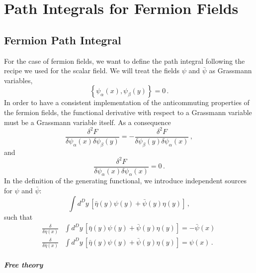 \documentclass[notes]{subfiles}
\renewcommand{\psibar}{\bar{\psi}}
\renewcommand{\etabar}{\bar{\eta}}
\begin{document}
\chapter{Path Integrals for Fermion Fields}
\label{cha:path-integr-ferm}
\section{Fermion Path Integral}
\label{sec:ferm-path-integr}

For the case of fermion fields, we want to define the path integral
following the recipe we used for the scalar field. We will treat the
fields $\psi$ and $\bar\psi$ as Grassmann variables, \ie 
\begin{equation}
  \label{eq:GrassVar}
  \left\{\psi_\alpha(x),\psi_\beta(y)\right\}=0\, .
\end{equation}
In order to have a consistent implementation of the anticommuting
properties of the fermion fields, the functional derivative with
respect to a Grassmann variable must be a Grassmann variable
itself. As a consequence
\begin{equation}
  \label{eq:GrassDer}
  \frac{\delta^2 F}{\delta \psi_\alpha(x) \delta\psi_\beta(y)} = 
  -\frac{\delta^2 F}{\delta \psi _\beta(y) \delta\psi_\alpha(x)}\, ,
\end{equation}
and 
\begin{equation}
  \label{eq:GrassDer2}
    \frac{\delta^2 F}{\delta \psi_\alpha(x) \delta\psi_\alpha(x)} = 0\,.
\end{equation}
In the definition of the generating functional, we introduce
independent sources for $\psi$ and $\bar{\psi}$:
\begin{equation}
  \label{eq:SourceTerm}
  \int d^Dy\, \left[
    \bar{\eta}(y) \psi(y) + \bar{\psi}(y) \eta(y)
    \right]\, ,
\end{equation}
such that
\begin{align}
  \label{eq:GrassDerivOne}
  \frac{\delta}{\delta\eta(x)} &\int d^Dy\, \left[
    \bar{\eta}(y) \psi(y) + \bar{\psi}(y) \eta(y)
    \right] = - \psibar(x)\, \\
  \label{eq:GrassDerivTwo}
  \frac{\delta}{\delta\etabar(x)} &\int d^Dy\, \left[
    \bar{\eta}(y) \psi(y) + \bar{\psi}(y) \eta(y)
    \right] = \psi(x)\, .
\end{align}

\paragraph{Free theory}
\end{document}
